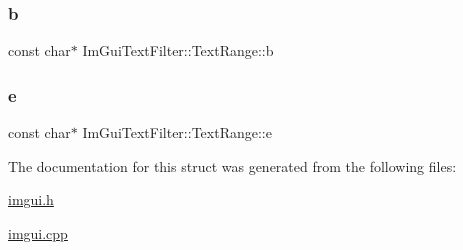 \subsubsection{\texorpdfstring{b}{b}}
{\footnotesize\ttfamily const char$\ast$ Im\+Gui\+Text\+Filter\+::\+Text\+Range\+::b}

\mbox{\label{struct_im_gui_text_filter_1_1_text_range_a20daef0e47167d49a017d8f54cb7c607}} 
\subsubsection{\texorpdfstring{e}{e}}
{\footnotesize\ttfamily const char$\ast$ Im\+Gui\+Text\+Filter\+::\+Text\+Range\+::e}



The documentation for this struct was generated from the following files\+:\begin{DoxyCompactItemize}
\item 
\mbox{\hyperlink{imgui_8h}{imgui.\+h}}\item 
\mbox{\hyperlink{imgui_8cpp}{imgui.\+cpp}}\end{DoxyCompactItemize}
